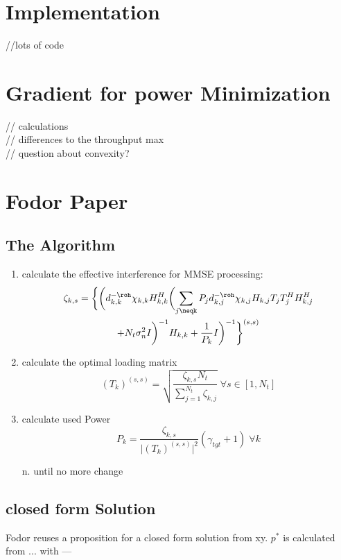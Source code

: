 \section{Implementation}
//lots of code\\

\section{Gradient for power Minimization}
// calculations\\
// differences to the throughput max\\
// question about convexity?\\

\section{Fodor Paper}

\subsection{The Algorithm}
\begin{enumerate}
	\item calculate the effective interference for MMSE processing:
		\begin{multline}
			\zeta_{k,s} = \biggl\{\biggl(d^{-\roh}_{k,k}\chi_{k,k}H^H_{k,k}\biggl(\sum_{j\neqk}{P_jd^{-\roh}_{k,j}\chi_{k,j}H_{k,j}T_jT_j^HH^H_{k,j}}\\
			+N_t\sigma^2_nI\biggr)^{-1}H_{k,k}+\frac{1}{P_k}I\biggr)^{-1}\biggr\}^{(s,s)}
		\end{multline}

	\item calculate the optimal loading matrix
		\begin{equation}
			(T_k)^{(s,s)} = \sqrt{\frac{\zeta_{k,s}N_t}{\sum_{j=1}^{N_t}\zeta_{k,j}}}\;\forall s\in[1,N_t]
		\end{equation}

	\item calculate used Power
		\begin{equation}
			P_k = \frac{\zeta_{k,s}}{\vert(T_k)^{(s,s)}\vert^2}(\gamma_{tgt}+1)\;\forall k
		\end{equation}

	\item[n.] until no more change

\end{enumerate}

\subsection{closed form Solution}
Fodor reuses a proposition for a closed form solution from xy.
$p^*$ is calculated from ... with ---